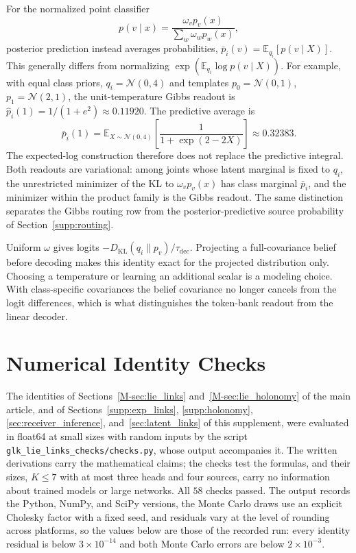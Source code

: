 \documentclass[twoside,11pt]{article}
\begin{document}
For the normalized point classifier
\begin{equation}
p(v\mid x)=\frac{\omega_vp_v(x)}
{\sum_w\omega_wp_w(x)},
\label{eq:readout_point_classifier}
\end{equation}
posterior prediction instead averages probabilities,
$\bar p_i(v)=\mathbb E_{q_i}[p(v\mid X)]$. This generally differs from normalizing $\exp(\mathbb E_{q_i}\log p(v\mid X))$. For example, with equal class priors, $q_i=\mathcal N(0,4)$ and templates $p_0=\mathcal N(0,1)$, $p_1=\mathcal N(2,1)$, the unit-temperature Gibbs readout is $\hat p_i(1)=1/(1+e^2)\approx0.11920$. The predictive average is
\begin{equation}
\bar p_i(1)=\mathbb E_{X\sim\mathcal N(0,4)}
\left[\frac{1}{1+\exp(2-2X)}\right]\approx0.32383.
\end{equation}
The expected-log construction therefore does not replace the predictive integral. Both readouts are variational: among joints whose latent marginal is fixed to $q_i$, the unrestricted minimizer of the KL to $\omega_vp_v(x)$ has class marginal $\bar p_i$, and the minimizer within the product family is the Gibbs readout. The same distinction separates the Gibbs routing row from the posterior-predictive source probability of Section~\ref{supp:routing}.

Uniform $\omega$ gives logits $-D_{\mathrm{KL}}(q_i\|p_v)/\tau_{\mathrm{dec}}$. Projecting a full-covariance belief before decoding makes this identity exact for the projected distribution only. Choosing a temperature or learning an additional scalar is a modeling choice. With class-specific covariances the belief covariance no longer cancels from the logit differences, which is what distinguishes the token-bank readout from the linear decoder.

\section{Numerical Identity Checks}
\label{app:identity_checks}

The identities of Sections~\ref{M-sec:lie_links} and~\ref{M-sec:lie_holonomy} of the main article, and of Sections~\ref{supp:exp_links}, \ref{supp:holonomy}, \ref{sec:receiver_inference}, and~\ref{sec:latent_links} of this supplement, were evaluated in float64 at small sizes with random inputs by the script \texttt{glk\_\allowbreak lie\_\allowbreak links\_\allowbreak checks/\allowbreak checks.py}, whose output accompanies it. The written derivations carry the mathematical claims; the checks test the formulas, and their sizes, $K\le7$ with at most three heads and four sources, carry no information about trained models or large networks. All $58$ checks passed. The output records the Python, NumPy, and SciPy versions, the Monte Carlo draws use an explicit Cholesky factor with a fixed seed, and residuals vary at the level of rounding across platforms, so the values below are those of the recorded run: every identity residual is below $3\times10^{-14}$ and both Monte Carlo errors are below $2\times10^{-3}$.
\end{document}
